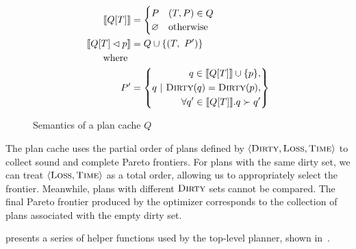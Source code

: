 \begin{figure}
  \begin{align*}
    \llbracket Q[T] \rrbracket &= \begin{cases}
      P & (T, P) \in Q \\
      \varnothing & \text{otherwise} \\
    \end{cases} \\
    \llbracket Q[T] \lhd p \rrbracket &= \begin{aligned} Q \cup \{(T,\ P') \} \end{aligned}\\
                                            \text{ where } \\
                                           P' &= \left\{q ~|~ \begin{aligned}
                                                                     q \in \llbracket Q[T] \rrbracket \cup \{p\}, \\
                                                                     \textsc{Dirty}(q) = \textsc{Dirty}(p),\\
                                                                     \forall q' \in \llbracket Q[T] \rrbracket.  q \succ q' 
                                                                   \end{aligned}
                                           \right\}
  \end{align*}
  \caption{Semantics of a plan cache $Q$}
  \label{fig:semantics-plan-cache}
\end{figure}

The plan cache uses the partial order of plans defined by  $\langle \textsc{Dirty}, \textsc{Loss}, \textsc{Time} \rangle$ to
collect sound and complete Pareto frontiers. For plans with the same dirty set, we can treat $\langle \textsc{Loss}, \textsc{Time} \rangle$
as a total order, allowing us to appropriately select the frontier. Meanwhile, plans with different $\textsc{Dirty}$ sets cannot be compared. The final
Pareto frontier produced by the optimizer corresponds to the collection of plans associated with the empty dirty set.

 presents a series of helper functions used by the top-level planner, shown in~.

